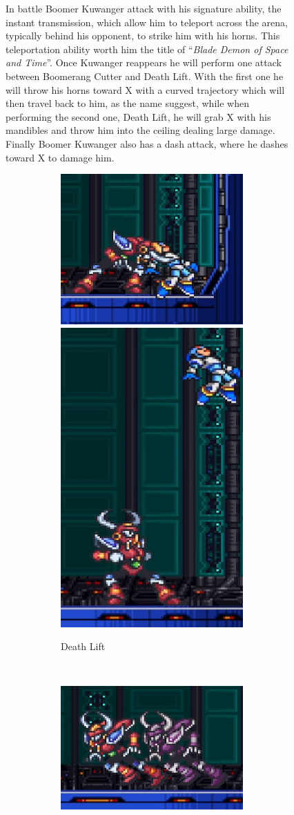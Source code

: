 \begin{figure}[htp]
In battle Boomer Kuwanger attack with his signature ability, the instant transmission, which allow him to teleport across the arena, typically behind his opponent, to strike him with his horns. This teleportation ability worth him the title of  ``\textit{Blade Demon of Space and Time}''\cite{book:MMX_Complete_art}. Once Kuwanger reappears he will perform one attack between Boomerang Cutter and Death Lift. With the first one he will throw his horns toward X with a curved trajectory which will then travel back to him, as the name suggest, while when performing the second one, Death Lift, he will grab X with his mandibles and throw him into the ceiling dealing large damage. Finally Boomer Kuwanger also has a dash attack, where he dashes toward X to damage him.
\begin{figure}[htp]
	\centering
	\begin{subfigure}{\linewidth}
		\centering
		\includegraphics[width=0.4\linewidth]{figures/X1/Boomer_kuwanger/Boomer_lift_1.jpg}
		\includegraphics[width=0.2\linewidth]{figures/X1/Boomer_kuwanger/Boomer_lift_2.jpg}
		\caption{Death Lift}
	\end{subfigure}\\
	\begin{subfigure}{0.41\linewidth}
		\centering
		\includegraphics[width=\linewidth]{figures/X1/Boomer_kuwanger/Boomer_dash.jpg}

\end{subfigure}
\end{figure}
\end{figure}
